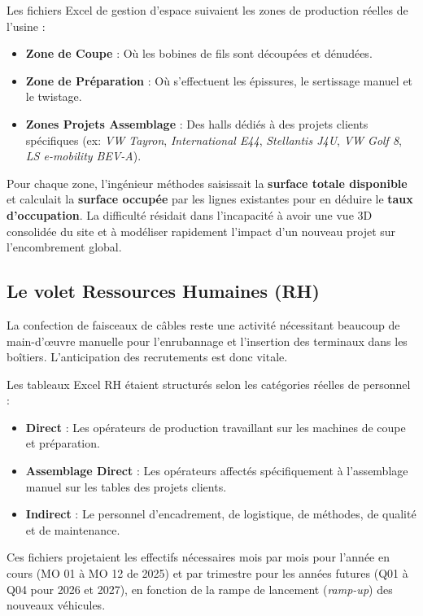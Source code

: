 Les fichiers Excel de gestion d'espace suivaient les zones de production réelles de l'usine :
\begin{itemize}
    \item \textbf{Zone de Coupe} : Où les bobines de fils sont découpées et dénudées.
    \item \textbf{Zone de Préparation} : Où s'effectuent les épissures, le sertissage manuel et le twistage.
    \item \textbf{Zones Projets Assemblage} : Des halls dédiés à des projets clients spécifiques (ex: \textit{VW Tayron}, \textit{International E44}, \textit{Stellantis J4U}, \textit{VW Golf 8}, \textit{LS e-mobility BEV-A}).
\end{itemize}
Pour chaque zone, l'ingénieur méthodes saisissait la \textbf{surface totale disponible} et calculait la \textbf{surface occupée} par les lignes existantes pour en déduire le \textbf{taux d'occupation}. La difficulté résidait dans l'incapacité à avoir une vue 3D consolidée du site et à modéliser rapidement l'impact d'un nouveau projet sur l'encombrement global.

\subsection{Le volet Ressources Humaines (RH)}
La confection de faisceaux de câbles reste une activité nécessitant beaucoup de main-d'œuvre manuelle pour l'enrubannage et l'insertion des terminaux dans les boîtiers. L'anticipation des recrutements est donc vitale.

Les tableaux Excel RH étaient structurés selon les catégories réelles de personnel :
\begin{itemize}
    \item \textbf{Direct} : Les opérateurs de production travaillant sur les machines de coupe et préparation.
    \item \textbf{Assemblage Direct} : Les opérateurs affectés spécifiquement à l'assemblage manuel sur les tables des projets clients.
    \item \textbf{Indirect} : Le personnel d'encadrement, de logistique, de méthodes, de qualité et de maintenance.
\end{itemize}
Ces fichiers projetaient les effectifs nécessaires mois par mois pour l'année en cours (MO 01 à MO 12 de 2025) et par trimestre pour les années futures (Q01 à Q04 pour 2026 et 2027), en fonction de la rampe de lancement (\textit{ramp-up}) des nouveaux véhicules.

